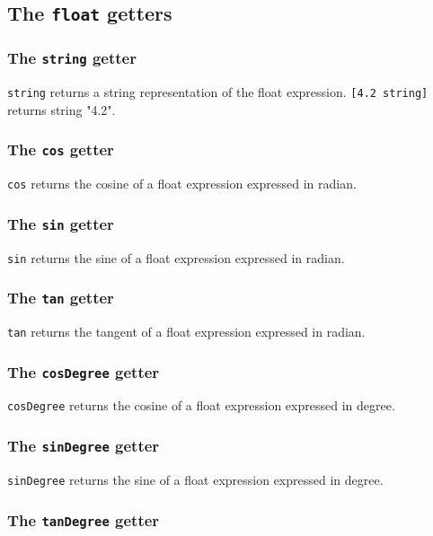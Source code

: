 \documentclass[10pt,openright,twosides,final]{memoir}
\newcommand{\scst}[1]{{\footnotesize\ttfamily\colorbox{light-blue}{"#1"}}}
\newcommand{\gtlinline}[1]{\colorbox{light-blue}{\lstinline[language=gtl]{#1}}}
\begin{document}
\subsection{The \texttt{float} getters}

\subsubsection{The \texttt{string} getter}

\gtlinline{string} returns a string representation of the float expression. \gtlinline{[4.2 string]} returns string \scst{4.2}.
  
\subsubsection{The \texttt{cos} getter}

\gtlinline{cos} returns the cosine of a float expression expressed in radian.

\subsubsection{The \texttt{sin} getter}

\gtlinline{sin} returns the sine of a float expression expressed in radian.

\subsubsection{The \texttt{tan} getter}

\gtlinline{tan} returns the tangent of a float expression expressed in radian.

\subsubsection{The \texttt{cosDegree} getter}

\gtlinline{cosDegree} returns the cosine of a float expression expressed in degree.

\subsubsection{The \texttt{sinDegree} getter}

\gtlinline{sinDegree} returns the sine of a float expression expressed in degree.

\subsubsection{The \texttt{tanDegree} getter}
\end{document}
